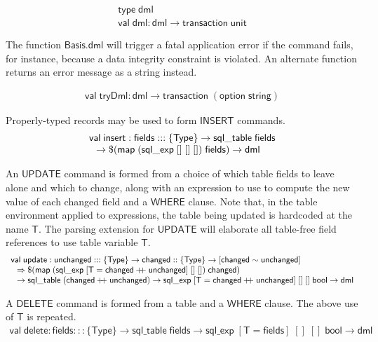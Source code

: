 \documentclass{article}
\newcommand{\mt}[1]{\mathsf{#1}}
\newcommand{\rc}{+ \hspace{-.075in} + \;}
\begin{document}
$$\begin{array}{l}
  \mt{type} \; \mt{dml} \\
  \mt{val} \; \mt{dml} : \mt{dml} \to \mt{transaction} \; \mt{unit}
\end{array}$$

The function $\mt{Basis.dml}$ will trigger a fatal application error if the command fails, for instance, because a data integrity constraint is violated.  An alternate function returns an error message as a string instead.

$$\begin{array}{l}
  \mt{val} \; \mt{tryDml} : \mt{dml} \to \mt{transaction} \; (\mt{option} \; \mt{string})
\end{array}$$

Properly-typed records may be used to form $\mt{INSERT}$ commands.
$$\begin{array}{l}
  \mt{val} \; \mt{insert} : \mt{fields} ::: \{\mt{Type}\} \to \mt{sql\_table} \; \mt{fields} \\
  \hspace{.1in} \to \$(\mt{map} \; (\mt{sql\_exp} \; [] \; [] \; []) \; \mt{fields}) \to \mt{dml}
\end{array}$$

An $\mt{UPDATE}$ command is formed from a choice of which table fields to leave alone and which to change, along with an expression to use to compute the new value of each changed field and a $\mt{WHERE}$ clause.  Note that, in the table environment applied to expressions, the table being updated is hardcoded at the name $\mt{T}$.  The parsing extension for $\mt{UPDATE}$ will elaborate all table-free field references to use table variable $\mt{T}$.
$$\begin{array}{l}
  \mt{val} \; \mt{update} : \mt{unchanged} ::: \{\mt{Type}\} \to \mt{changed} :: \{\mt{Type}\} \to [\mt{changed} \sim \mt{unchanged}] \\
  \hspace{.1in} \Rightarrow \$(\mt{map} \; (\mt{sql\_exp} \; [\mt{T} = \mt{changed} \rc \mt{unchanged}] \; [] \; []) \; \mt{changed}) \\
  \hspace{.1in} \to \mt{sql\_table} \; (\mt{changed} \rc \mt{unchanged}) \to \mt{sql\_exp} \; [\mt{T} = \mt{changed} \rc \mt{unchanged}] \; [] \; [] \; \mt{bool} \to \mt{dml}
\end{array}$$

A $\mt{DELETE}$ command is formed from a table and a $\mt{WHERE}$ clause.  The above use of $\mt{T}$ is repeated.
$$\begin{array}{l}
  \mt{val} \; \mt{delete} : \mt{fields} ::: \{\mt{Type}\} \to \mt{sql\_table} \; \mt{fields} \to \mt{sql\_exp} \; [\mt{T} = \mt{fields}] \; [] \; [] \; \mt{bool} \to \mt{dml}
\end{array}$$
\end{document}
